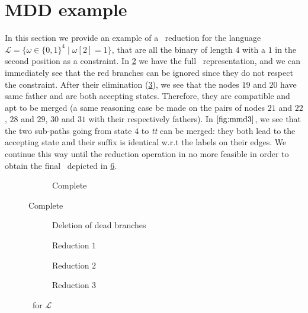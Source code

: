 \section{MDD example}
\label{sec:mdd_example}
In this section we provide an example of a \mdd\ reduction for the language $\mathcal{L} = \{\omega \in \{0, 1\}^4 \mid \omega[2] = 1\}$, that are all the binary of length $4$ with a $1$ in the second position as a constraint. In \cref{fig:mmd1} we have the full \mdd\ representation, and we can immediately see that the red branches can be ignored since they do not respect the constraint. After their elimination (\cref{fig:mmd2}), we see that the nodes $19$ and $20$ have same father and are both accepting states. Therefore, they are compatible and apt to be merged (a same reasoning case be made on the pairs of nodes $21$ and $22$, $28$ and $29$, $30$ and $31$ with their respectively fathers). In $\cref{fig:mmd3}$, we see that the two sub-paths going from state $4$ to \textit{tt} can be merged: they both lead to the accepting state and their suffix is identical w.r.t the labels on their edges. We continue this way until the reduction operation in no more feasible in order to obtain the final \mdd\ depicted in \cref{fig:mmd5}.

\begin{figure}[!htb]
	\centering
	\begin{subfigure}[b]{1\linewidth}
		\centering
		\scalebox{.8}{
			
		}
		\caption{Complete \mdd}
		\label{fig:mmd1}
	\end{subfigure}
\end{figure}

\begin{figure}[!htb]\ContinuedFloat
	\def\scale{.65}
	\centering
	\begin{subfigure}[b]{.34\linewidth}
		\centering
		\scalebox{\scale}{
			
		}
		\caption{Deletion of dead branches}
		\label{fig:mmd2}
	\end{subfigure}
	\hfill
	\begin{subfigure}[b]{.34\linewidth}
		\centering
		\scalebox{\scale}{
			
		}
		\caption{Reduction $1$}
		\label{fig:mmd3}
	\end{subfigure}
	\hfil
	\begin{subfigure}[b]{.15\linewidth}
		\centering
		\scalebox{\scale}{
			
		}
		\caption{Reduction $2$}
		\label{fig:mmd4}
	\end{subfigure}
	\hfill
	\begin{subfigure}[b]{.15\linewidth}
		\centering
		\scalebox{\scale}{
			
		}
		\caption{Reduction $3$}
		\label{fig:mmd5}
	\end{subfigure}

	\caption{\mdd\ for $\mathcal{L}$}
	\label{fig:mmd}
\end{figure}

\newpage